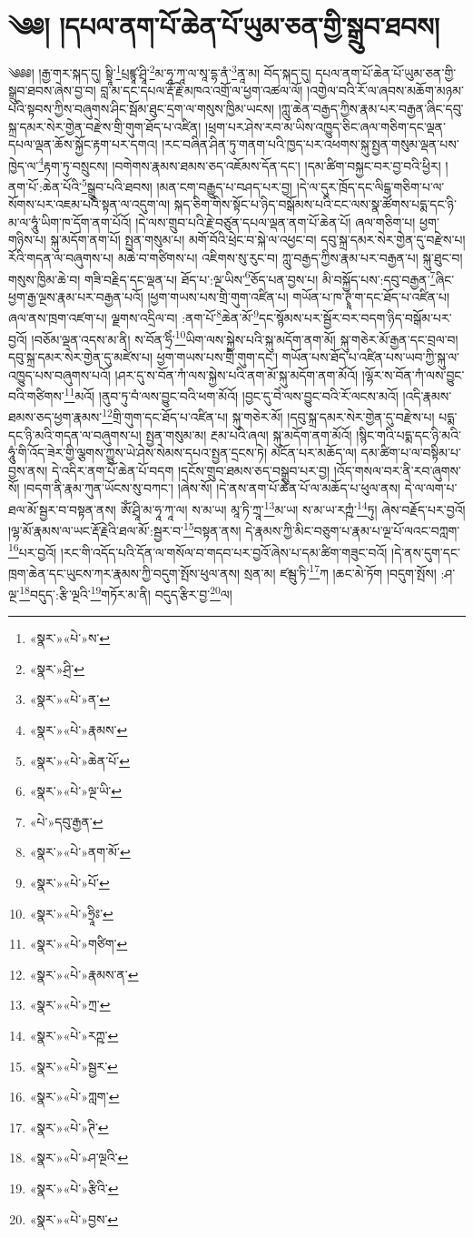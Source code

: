 \chapter{༄༅། །དཔལ་ནག་པོ་ཆེན་པོ་ཡུམ་ཅན་གྱི་སྒྲུབ་ཐབས།}༄༅༅། །རྒྱ་གར་སྐད་དུ། སྟྲཱི་\footnote{«སྣར་»«པེ་»ས་}པྲཛྙཱ་ཤྲཱི་\footnote{«སྣར་»ཤྲི་}མ་ཧཱ་ཀཱ་ལ་སཱ་དྷ་ནཾ་\footnote{«སྣར་»«པེ་»ན་}ནཱ་མ། བོད་སྐད་དུ། དཔལ་ནག་པོ་ཆེན་པོ་ཡུམ་ཅན་གྱི་སྒྲུབ་ཐབས་ཞེས་བྱ་བ། བླ་མ་དང་དཔལ་རྡོ་རྗེ་མཁའ་འགྲོ་ལ་ཕྱག་འཚལ་ལོ། །འགྱེལ་བའི་རོ་ལ་ཞབས་མཆོག་མཉམ་པའི་སྟབས་ཀྱིས་བཞུགས་ཤིང་སྦོམ་ཐུང་དྲག་ལ་གསུས་ཁྱིམ་ཡངས། །ཀླུ་ཆེན་བརྒྱད་ཀྱིས་རྣམ་པར་བརྒྱན་ཞིང་དབུ་སྐྲ་དམར་སེར་གྱེན་བརྫེས་གྲི་གུག་ཐོད་པ་འཛིན། །ཕྲག་པར་ཤེས་རབ་མ་ཡིས་འཁྱུད་ཅིང་ཞལ་གཅིག་དང་ལྡན་དཔལ་ལྡན་ཆོས་སྐྱོང་རྟག་པར་དགའ། །རང་བཞིན་ཤིན་ཏུ་གནག་པའི་ཁྱད་པར་འཕགས་སྐུ་སྤྱན་གསུམ་ལྡན་པས་ཁྱེད་ལ་\footnote{«སྣར་»«པེ་»རྣམས་}རྟག་ཏུ་བསྲུངས། །བགེགས་རྣམས་ཐམས་ཅད་འཇོམས་དོན་དང་། །དམ་ཚིག་བསྐྱང་བར་བྱ་བའི་ཕྱིར། །ནག་པོ་:ཆེན་པོའི་\footnote{«སྣར་»«པེ་»ཆེན་པོ་}སྒྲུབ་པའི་ཐབས། །མན་ངག་བརྒྱུད་པ་བཤད་པར་བྱ། །དེ་ལ་དུར་ཁྲོད་དང་ལིངྒ་གཅིག་པ་ལ་སོགས་པར་འཇམ་པའི་སྟན་ལ་འདུག་ལ། སྐད་ཅིག་གིས་སྟོང་པ་ཉིད་བསྒོམས་པའི་ངང་ལས་སྣ་ཚོགས་པདྨ་དང་ཉི་མ་ལ་ཧཱུཾ་ཡིག་ཁ་དོག་ནག་པོའོ། །དེ་ལས་གྲུབ་པའི་རྗེ་བཙུན་དཔལ་ལྡན་ནག་པོ་ཆེན་པོ། ཞལ་གཅིག་པ། ཕྱག་གཉིས་པ། སྐུ་མདོག་ནག་པོ། སྤྱན་གསུམ་པ། མགོ་བོའི་ཕྲེང་བ་སྐེ་ལ་འཕྱང་བ། དབུ་སྐྲ་དམར་སེར་གྱེན་དུ་བརྫེས་པ། རོའི་གདན་ལ་བཞུགས་པ། མཆེ་བ་གཙིགས་པ། འཇིགས་སུ་རུང་བ། ཀླུ་བརྒྱད་ཀྱིས་རྣམ་པར་བརྒྱན་པ། སྐུ་ཐུང་བ། གསུས་ཁྱིམ་ཆེ་བ། གཟི་བརྗིད་དང་ལྡན་པ། ཐོད་པ་:ལྔ་ཡིས་\footnote{«སྣར་»«པེ་»ལྔ་ཡི་}ཅོད་པན་བྱས་པ། མི་བསྐྱོད་པས་:དབུ་བརྒྱན་\footnote{«པེ་»དབུ་རྒྱན་}ཞིང་ཕྱག་རྒྱ་ལྔས་རྣམ་པར་བརྒྱན་པའོ། །ཕྱག་གཡས་པས་གྲི་གུག་འཛིན་པ། གཡོན་པ་ཁ་ཊྭཱཾ་ག་དང་ཐོད་པ་འཛིན་པ། ཞལ་ནས་ཁྲག་འཛག་པ། ལྗགས་འདྲིལ་བ། :ནག་པོ་\footnote{«སྣར་»«པེ་»ནག་མོ་}ཆེན་མོ་\footnote{«སྣར་»«པེ་»པོ་}དང་སྙོམས་པར་སྦྱོར་བར་བདག་ཉིད་བསྒོམ་པར་བྱའོ། །བཅོམ་ལྡན་འདས་མ་ནི། ས་བོན་ཧྲིཾ་\footnote{«སྣར་»«པེ་»ཧྲཱིཿ་}ཡིག་ལས་སྐྱེས་པའི་སྐུ་མདོག་ནག་མོ། སྐུ་གཅེར་མོ་རྒྱན་དང་བྲལ་བ། དབུ་སྐྲ་དམར་སེར་གྱེན་དུ་མཛེས་པ། ཕྱག་གཡས་པས་གྲི་གུག་དང་། གཡོན་པས་ཐོད་པ་འཛིན་པས་ཡབ་ཀྱི་སྐུ་ལ་འཁྱུད་པས་བཞུགས་པའོ། །ཤར་དུ་ས་བོན་ཀཾ་ལས་སྐྱེས་པའི་ནག་མོ་སྐུ་མདོག་ནག་མོའོ། །ལྷོར་ས་བོན་ཀཾ་ལས་བྱུང་བའི་གཙིགས་\footnote{«སྣར་»«པེ་»གཙིག་}མའོ། །ནུབ་ཏུ་བཾ་ལས་བྱུང་བའི་ཕག་མོའོ། །བྱང་དུ་བེཾ་ལས་བྱུང་བའི་རོ་ལངས་མའོ། །འདི་རྣམས་ཐམས་ཅད་ཕྱག་རྣམས་\footnote{«སྣར་»«པེ་»རྣམས་ན་}གྲི་གུག་དང་ཐོད་པ་འཛིན་པ། སྐུ་གཅེར་མོ། །དབུ་སྐྲ་དམར་སེར་གྱེན་དུ་བརྫེས་པ། པདྨ་དང་ཉི་མའི་གདན་ལ་བཞུགས་པ། སྤྱན་གསུམ་མ། རྔམ་པའི་ཞལ། སྐུ་མདོག་ནག་མོའོ། །སྙིང་གའི་པདྨ་དང་ཉི་མའི་ཧཱུཾ་གི་འོད་ཟེར་གྱི་ལྕགས་ཀྱུས་ཡེ་ཤེས་སེམས་དཔའ་སྤྱན་དྲངས་ཏེ། མངོན་པར་མཆོད་ལ། དམ་ཚིག་པ་ལ་བསྟིམ་པ་བྱས་ནས། དེ་འདིར་ནག་པོ་ཆེན་པོ་བདག །དངོས་གྲུབ་ཐམས་ཅད་བསྒྲུབ་པར་བྱ། །འོད་གསལ་བར་ནི་རབ་ཞུགས་སོ། །བདག་ནི་རྣམ་ཀུན་ཡོངས་སུ་བཀང་། །ཞེས་སོ། །དེ་ནས་ནག་པོ་ཆེན་པོ་ལ་མཆོད་པ་ཕུལ་ནས། དེ་ལ་ལག་པ་ཐལ་མོ་སྦྱར་བ་བསྟན་ནས། ཨོཾ་ཤྲཱི་མ་ཧཱ་ཀཱ་ལ། ས་མ་ཡ། མཱ་ཏི་ཀྲཱ་\footnote{«སྣར་»«པེ་»ཀྲ་}མ་ཡ། ས་མ་ཡ་རཀྵཾ་\footnote{«སྣར་»«པེ་»རཀྵ་}ཏུ། ཞེས་བརྗོད་པར་བྱའོ། །ལྷ་མོ་རྣམས་ལ་ཡང་རྡོ་རྗེའི་ཐལ་མོ་:སྦྱར་བ་\footnote{«སྣར་»«པེ་»སྦྱར་}བསྟན་ནས། དེ་རྣམས་ཀྱི་མིང་བཅུག་པ་རྣམ་པ་ལྔ་པོ་ལའང་བཀླག་\footnote{«སྣར་»«པེ་»ཀླག་}པར་བྱའོ། །རང་གི་འདོད་པའི་དོན་ལ་གསོལ་བ་གདབ་པར་བྱའོ་ཞེས་པ་དམ་ཚིག་གཟུང་བའོ། །དེ་ནས་དུག་དང་ཁྲག་ཆེན་དང་ཡུངས་ཀར་རྣམས་ཀྱི་བདུག་སྤོས་ཕུལ་ནས། སྲན་མ། ཛམྦུ་ཏི་\footnote{«སྣར་»«པེ་»ཊི་}ཀ །ཆང་མེ་ཏོག །བདུག་སྤོས། :ཤ་ལྔ་\footnote{«སྣར་»«པེ་»ཤ་ལྔའི་}བདུད་:རྩི་ལྔའི་\footnote{«སྣར་»«པེ་»རྩིའི་}གཏོར་མ་ནི། བདུད་རྩིར་བྱ་\footnote{«སྣར་»«པེ་»བྱས་}ལ། 